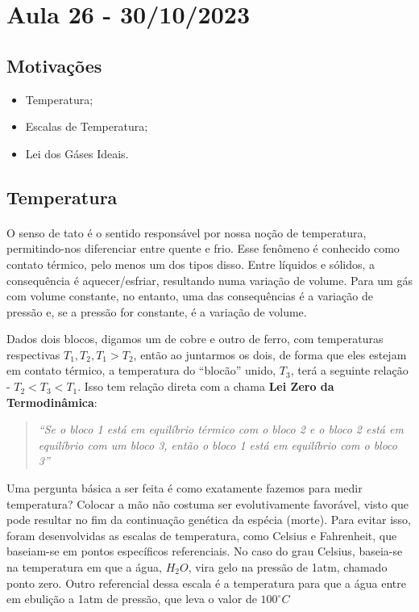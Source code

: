 \documentclass[PhysicsII/phsyicsII_notes.tex]{subfiles}
\begin{document}
\section{Aula 26 - 30/10/2023}
\subsection{Motivações}
\begin{itemize}
	\item Temperatura;
	\item Escalas de Temperatura;
	\item Lei dos Gáses Ideais.
\end{itemize}
\subsection{Temperatura}
\paragraph{} O senso de tato é o sentido responsável por nossa noção de temperatura, permitindo-nos diferenciar
entre quente e frio. Esse fenômeno é conhecido como contato térmico, pelo menos um dos tipos disso. Entre líquidos e sólidos,
a consequência é aquecer/esfriar, resultando numa variação de volume. Para um gás com volume constante, no entanto, uma
das consequências é a variação de pressão e, se a pressão for constante, é a variação de volume.

Dados dois blocos, digamos um de cobre e outro de ferro, com temperaturas respectivas \(T_{1}, T_{2}, T_{1} > T_{2}\), então ao
juntarmos os dois, de forma que eles estejam em contato térmico, a temperatura do ``blocão'' unido, \(T_{3}\), terá a seguinte relação -
\(T_{2} < T_{3} < T_{1}\). Isso tem relação direta com a chama \textbf{Lei Zero da Termodinâmica}:
\begin{quote}
	\textit{``Se o bloco 1 está em equilíbrio térmico com o bloco 2 e o bloco 2 está em equilíbrio com um bloco 3, então
		o bloco 1 está em equilíbrio com o bloco 3''}
\end{quote}
Uma pergunta básica a ser feita é como exatamente fazemos para medir temperatura? Colocar a mão não costuma ser evolutivamente favorável, visto que pode resultar
no fim da continuação genética da espécia (morte). Para evitar isso, foram desenvolvidas as escalas de temperatura, como Celsius e Fahrenheit, que baseiam-se
em pontos específicos referenciais. No caso do grau Celsius, baseia-se na temperatura em que a água, \(H_{2}O\), vira gelo na pressão de 1atm, chamado ponto zero.
Outro referencial dessa escala é a temperatura para que a água entre em ebulição a 1atm de pressão, que leva o valor de \(100^{\circ{}}C\)
\end{document}
